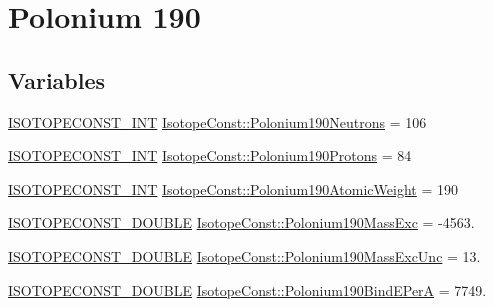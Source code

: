 \hypertarget{group___isotope_const-_polonium-_po190}{}\section{Polonium 190}
\label{group___isotope_const-_polonium-_po190}
\subsection*{Variables}
\begin{DoxyCompactItemize}
\item 
\mbox{\hyperlink{group___isotope_const-_macros_ga5f18360b3e99483a35c32d789e62621c}{I\+S\+O\+T\+O\+P\+E\+C\+O\+N\+S\+T\+\_\+\+I\+NT}} \mbox{\hyperlink{group___isotope_const-_polonium-_po190_gabccb893231399b4a494dece59b0e1787}{Isotope\+Const\+::\+Polonium190\+Neutrons}} = 106
\item 
\mbox{\hyperlink{group___isotope_const-_macros_ga5f18360b3e99483a35c32d789e62621c}{I\+S\+O\+T\+O\+P\+E\+C\+O\+N\+S\+T\+\_\+\+I\+NT}} \mbox{\hyperlink{group___isotope_const-_polonium-_po190_ga231c606515cd9fb6805a72f1beb53257}{Isotope\+Const\+::\+Polonium190\+Protons}} = 84
\item 
\mbox{\hyperlink{group___isotope_const-_macros_ga5f18360b3e99483a35c32d789e62621c}{I\+S\+O\+T\+O\+P\+E\+C\+O\+N\+S\+T\+\_\+\+I\+NT}} \mbox{\hyperlink{group___isotope_const-_polonium-_po190_gaa77be234985cdba458a5e5307aacf633}{Isotope\+Const\+::\+Polonium190\+Atomic\+Weight}} = 190
\item 
\mbox{\hyperlink{group___isotope_const-_macros_ga8f45a7272ce02c0b4c65c44636ed719a}{I\+S\+O\+T\+O\+P\+E\+C\+O\+N\+S\+T\+\_\+\+D\+O\+U\+B\+LE}} \mbox{\hyperlink{group___isotope_const-_polonium-_po190_gab64edd4764fab43defd27efb137454d7}{Isotope\+Const\+::\+Polonium190\+Mass\+Exc}} = -\/4563.
\item 
\mbox{\hyperlink{group___isotope_const-_macros_ga8f45a7272ce02c0b4c65c44636ed719a}{I\+S\+O\+T\+O\+P\+E\+C\+O\+N\+S\+T\+\_\+\+D\+O\+U\+B\+LE}} \mbox{\hyperlink{group___isotope_const-_polonium-_po190_ga86e3844502504217c124654b21af5ef5}{Isotope\+Const\+::\+Polonium190\+Mass\+Exc\+Unc}} = 13.
\item 
\mbox{\hyperlink{group___isotope_const-_macros_ga8f45a7272ce02c0b4c65c44636ed719a}{I\+S\+O\+T\+O\+P\+E\+C\+O\+N\+S\+T\+\_\+\+D\+O\+U\+B\+LE}} \mbox{\hyperlink{group___isotope_const-_polonium-_po190_ga017fe89f2f6946d7bbc95e52de9bb2f5}{Isotope\+Const\+::\+Polonium190\+Bind\+E\+PerA}} = 7749.
\item 

\end{DoxyCompactItemize}
